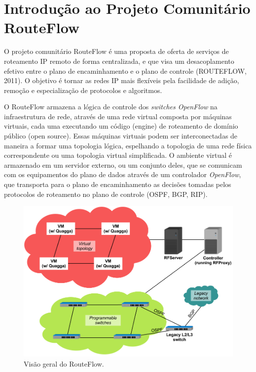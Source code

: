 \section{Introdução ao Projeto Comunitário RouteFlow}

O projeto comunitário RouteFlow é uma proposta de oferta de serviços de
roteamento IP remoto de forma centralizada, e que visa um
desacoplamento efetivo entre o plano de encaminhamento e o
plano de controle (ROUTEFLOW, 2011). O objetivo é tornar as
redes IP mais flexíveis pela facilidade de adição,
remoção e especialização de protocolos e algoritmos.

O RouteFlow armazena a lógica de
controle dos \textit{switches OpenFlow} na infraestrutura de rede,
através de uma rede virtual composta por máquinas virtuais, cada uma executando um código
(engine) de roteamento de domínio público (open source).
Essas máquinas virtuais podem ser interconectadas
de maneira a formar uma topologia lógica, espelhando a
topologia de uma rede física correspondente ou uma topologia
virtual simplificada. O ambiente virtual é armazenado em um
servidor externo, ou um conjunto deles, que se comunicam com
os equipamentos do plano de dados através de um controlador
\textit{OpenFlow}, que transporta para o plano de encaminhamento as
decisões tomadas pelos protocolos de roteamento no plano de
controle (OSPF, BGP, RIP). 

\begin{figure}[h]
\centering
\includegraphics[width=160mm]{visaoGeralRouteFlow.png}
\caption{Visão geral do RouteFlow.}
\label{fig:visaoGeralRouteFlow} 
\end{figure}

